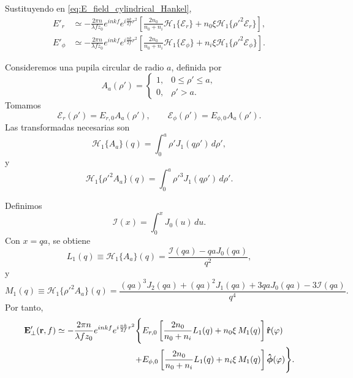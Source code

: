 Sustituyendo en \eqref{eq:E_field_cylindrical_Hankel},
\begin{equation}
\begin{aligned}
E'_r
&\simeq
-\frac{2\pi n}{\lambda f z_0}
e^{inkf}
e^{i\frac{nk}{2f}r^2}
\left[
\frac{2n_0}{n_0+n_i}\mathscr H_1\{\mathscr E_r\}
+
n_0\xi
\mathscr H_1\{\rho'^2\mathscr E_r\}
\right],
\\
E'_\phi
&\simeq
-\frac{2\pi n}{\lambda f z_0}
e^{inkf}
e^{i\frac{nk}{2f}r^2}
\left[
\frac{2n_0}{n_0+n_i}\mathscr H_1\{\mathscr E_\phi\}
+
n_i\xi
\mathscr H_1\{\rho'^2\mathscr E_\phi\}
\right].
\end{aligned}
\label{eq:E_cylindrical_paraxial}
\end{equation}

Consideremos una pupila circular de radio \(a\), definida por
\begin{equation}
  A_a(\rho')
  =
  \begin{cases}
  1, & 0\leq \rho'\leq a,\\
  0, & \rho'>a.
  \end{cases}
\end{equation}
Tomamos
\begin{equation}
  \mathscr E_r(\rho')=E_{r,0}A_a(\rho'),
  \qquad
  \mathscr E_\phi(\rho')=E_{\phi,0}A_a(\rho').
\end{equation}
Las transformadas necesarias son
\begin{equation}
  \mathscr H_1\{A_a\}(q)
  =
  \int_0^a
  \rho'J_1(q\rho')\,d\rho',
\end{equation}
y
\begin{equation}
  \mathscr H_1\{\rho'^2A_a\}(q)
  =
  \int_0^a
  \rho'^3J_1(q\rho')\,d\rho'.
\end{equation}

Definimos
\begin{equation}
  \mathcal I(x)
  =
  \int_0^x J_0(u)\,du.
  \label{eq:Lommel_I_def_cylindrical}
\end{equation}
Con \(x=qa\), se obtiene
\begin{equation}
  L_1(q)
  \equiv
  \mathscr H_1\{A_a\}(q)
  =
  \frac{\mathcal I(qa)-qaJ_0(qa)}{q^2},
  \label{eq:L1_def_cylindrical}
\end{equation}
y
\begin{equation}
  M_1(q)
  \equiv
  \mathscr H_1\{\rho'^2A_a\}(q)
  =
  \frac{
  (qa)^3J_2(qa)
  +
  (qa)^2J_1(qa)
  +
  3qaJ_0(qa)
  -
  3\mathcal I(qa)
  }{q^4}.
  \label{eq:M1_def_cylindrical}
\end{equation}
Por tanto,
\begin{equation}
\begin{aligned}
\vb E'_\perp(\vb r,f)
\simeq
-\frac{2\pi n}{\lambda f z_0}
e^{inkf}
e^{i\frac{nk}{2f}r^2}
\Bigg\{
&
E_{r,0}
\left[
\frac{2n_0}{n_0+n_i}L_1(q)
+
n_0\xi\,M_1(q)
\right]\bm{\hat{\mathbf{r}}}(\varphi)
\\
+
&
E_{\phi,0}
\left[
\frac{2n_0}{n_0+n_i}L_1(q)
+
n_i\xi\,M_1(q)
\right]\bm{\hat{\mathbf{\phi}}}(\varphi)
\Bigg\}.
\end{aligned}
\label{eq:E_cylindrical_homogeneous}
\end{equation}

